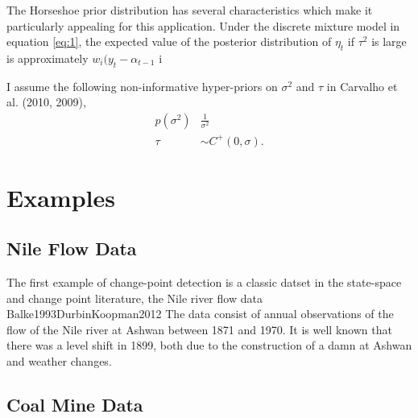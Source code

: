 \documentclass{article}
\begin{document}

The Horseshoe prior distribution has several characteristics which make it particularly appealing for this application.
Under the discrete mixture model in equation \eqref{eq:1}, the expected value of the posterior distribution of $\eta_{t}$ if $\tau^{2}$ is large is approximately $w_{i} (y_{t} - \alpha_{t-1}$ i
\begin{equation}
  \label{eq:18}
\end{equation}

I assume the following non-informative hyper-priors on $\sigma^{2}$ and $\tau$ in Carvalho et al. (2010, 2009),
\begin{align}
  \label{eq:9}
  p(\sigma^{2}) & \frac{1}{\sigma^{2}}  \\
  \label{eq:11}
  \tau &\sim C^{+}(0, \sigma) \text{.}
\end{align}

\section{Examples}
\label{sec:examples}

\subsection{Nile Flow Data}
\label{sec:nile}

The first example of change-point detection is a classic datset in the state-space and change point literature, the Nile river flow data \textcite{Cobb1978}{Balke1993}{DurbinKoopman2012}
The data consist of annual observations of the flow of the Nile river at Ashwan between 1871 and 1970. 
It is well known that there was a level shift in 1899, both due to the construction of a damn at Ashwan and weather changes.

\subsection{Coal Mine Data}
\label{sec:coal-mine-data}



\printbibliography{}
\end{document}
